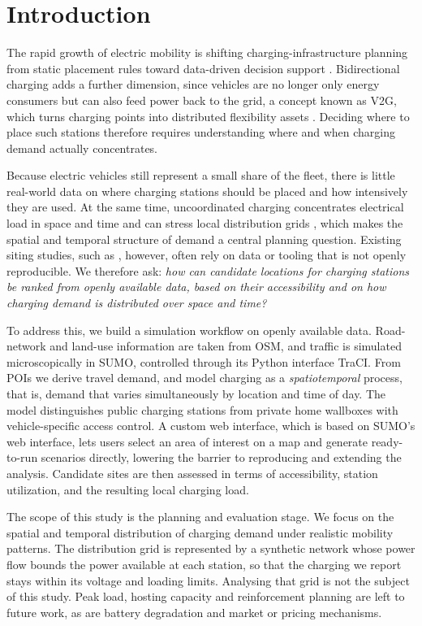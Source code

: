 \section{Introduction}
\label{sec:introduction}
The rapid growth of electric mobility is shifting charging-infrastructure planning from static placement rules toward data-driven decision support \cite{iea2023evoutlook}. Bidirectional charging adds a further dimension, since vehicles are no longer only energy consumers but can also feed power back to the grid, a concept known as \ac{V2G}, which turns charging points into distributed flexibility assets \cite{kempton2005v2g}. Deciding where to place such stations therefore requires understanding where and when charging demand actually concentrates.

Because electric vehicles still represent a small share of the fleet, there is little real-world data on where charging stations should be placed and how intensively they are used. At the same time, uncoordinated charging concentrates electrical load in space and time and can stress local distribution grids \cite{clementnyns2010impact}, which makes the spatial and temporal structure of demand a central planning question. Existing siting studies, such as \cite{he2013siting}, however, often rely on data or tooling that is not openly reproducible. We therefore ask: \emph{how can candidate locations for charging stations be ranked from openly available data, based on their accessibility and on how charging demand is distributed over space and time?}

To address this, we build a simulation workflow on openly available data. Road-network and land-use information are taken from \ac{OSM}, and traffic is simulated microscopically in \ac{SUMO}, controlled through its Python interface \ac{TraCI}. From \acsp{POI} we derive travel demand, and model charging as a \emph{spatiotemporal} process, that is, demand that varies simultaneously by location and time of day. The model distinguishes public charging stations from private home wallboxes with vehicle-specific access control. A custom web interface, which is based on \ac{SUMO}'s web interface, lets users select an area of interest on a map and generate ready-to-run scenarios directly, lowering the barrier to reproducing and extending the analysis. Candidate sites are then assessed in terms of accessibility, station utilization, and the resulting local charging load.

The scope of this study is the planning and evaluation stage. We focus on the spatial and temporal distribution of charging demand under realistic mobility patterns. The distribution grid is represented by a synthetic network whose power flow bounds the power available at each station, so that the charging we report stays within its voltage and loading limits. Analysing that grid is not the subject of this study. Peak load, hosting capacity and reinforcement planning are left to future work, as are battery degradation and market or pricing mechanisms.